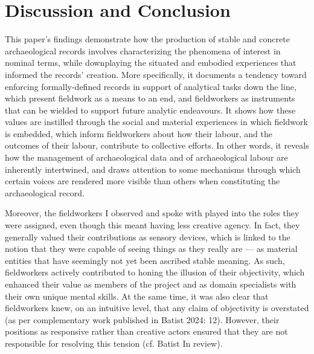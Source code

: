 \documentclass[
]{article}
\begin{document}
\section{Discussion and Conclusion}\label{discussion-and-conclusion}

This paper's findings demonstrate how the production of stable and
concrete archaeological records involves characterizing the phenomena of
interest in nominal terms, while downplaying the situated and embodied
experiences that informed the records' creation. More specifically, it
documents a tendency toward enforcing formally-defined records in
support of analytical tasks down the line, which present fieldwork as a
means to an end, and fieldworkers as instruments that can be wielded to
support future analytic endeavours. It shows how these values are
instilled through the social and material experiences in which fieldwork
is embedded, which inform fieldworkers about how their labour, and the
outcomes of their labour, contribute to collective efforts. In other
words, it reveals how the management of archaeological data and of
archaeological labour are inherently intertwined, and draws attention to
some mechanisms through which certain voices are rendered more visible
than others when constituting the archaeological record.

Moreover, the fieldworkers I observed and spoke with played into the
roles they were assigned, even though this meant having less creative
agency. In fact, they generally valued their contributions as sensory
devices, which is linked to the notion that they were capable of seeing
things as they really are --- as material entities that have seemingly
not yet been ascribed stable meaning. As such, fieldworkers actively
contributed to honing the illusion of their objectivity, which enhanced
their value as members of the project and as domain specialists with
their own unique mental skills. At the same time, it was also clear that
fieldworkers knew, on an intuitive level, that any claim of objectivity
is overstated (as per complementary work published in Batist 2024: 12).
However, their positions as responsive rather than creative actors
ensured that they are not responsible for resolving this tension (cf.
Batist In review).
\end{document}
